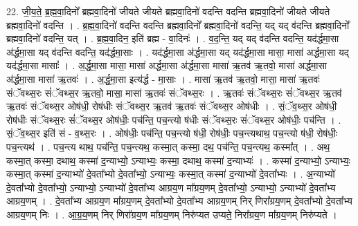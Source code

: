 \documentclass[17pt]{extarticle}
\begin{document}
22. जी॒य॒ते॒ ब्र॒ह्म॒वा॒दिनो᳚ ब्रह्मवा॒दिनो॑ जीयते जीयते ब्रह्मवा॒दिनो॑ वदन्ति वदन्ति ब्रह्मवा॒दिनो॑ जीयते जीयते ब्रह्मवा॒दिनो॑ वदन्ति । . ब्र॒ह्म॒वा॒दिनो॑ वदन्ति वदन्ति ब्रह्मवा॒दिनो᳚ ब्रह्मवा॒दिनो॑ वदन्ति॒ यद् यद् व॑दन्ति ब्रह्मवा॒दिनो᳚ ब्रह्मवा॒दिनो॑ वदन्ति॒ यत् । . ब्र॒ह्म॒वा॒दिन॒ इति॑ ब्रह्म - वा॒दिनः॑ । . व॒द॒न्ति॒ यद् यद् व॑दन्ति वदन्ति॒ यद॑र्द्धमा॒सा अ॑र्द्धमा॒सा यद् व॑दन्ति वदन्ति॒ यद॑र्द्धमा॒साः । . यद॑र्द्धमा॒सा अ॑र्द्धमा॒सा यद् यद॑र्द्धमा॒सा मासा॒ मासा॑ अर्द्धमा॒सा यद् यद॑र्द्धमा॒सा मासाः᳚ । . अ॒र्द्ध॒मा॒सा मासा॒ मासा॑ अर्द्धमा॒सा अ॑र्द्धमा॒सा मासा॑ ऋ॒तव॑ ऋ॒तवो॒ मासा॑ अर्द्धमा॒सा अ॑र्द्धमा॒सा मासा॑ ऋ॒तवः॑ । . अ॒र्द्ध॒मा॒सा इत्य॑र्द्ध - मा॒साः । . मासा॑ ऋ॒तव॑ ऋ॒तवो॒ मासा॒ मासा॑ ऋ॒तवः॑ संॅवथ्स॒रः सं॑ॅवथ्स॒र ऋ॒तवो॒ मासा॒ मासा॑ ऋ॒तवः॑ संॅवथ्स॒रः । . ऋ॒तवः॑ संॅवथ्स॒रः सं॑ॅवथ्स॒र ऋ॒तव॑ ऋ॒तवः॑ संॅवथ्स॒र ओष॑धी॒ रोष॑धीः संॅवथ्स॒र ऋ॒तव॑ ऋ॒तवः॑ संॅवथ्स॒र ओष॑धीः । . सं॒ॅव॒थ्स॒र ओष॑धी॒ रोष॑धीः संॅवथ्स॒रः सं॑ॅवथ्स॒र ओष॑धीः॒ पच॑न्ति॒ पच॒न्त्यो ष॑धीः संॅवथ्स॒रः सं॑ॅवथ्स॒र ओष॑धीः॒ पच॑न्ति । . सं॒ॅव॒थ्स॒र इति॑ सं - व॒थ्स॒रः । . ओष॑धीः॒ पच॑न्ति॒ पच॒न्त्यो ष॑धी॒ रोष॑धीः॒ पच॒न्त्यथाथ॒ पच॒न्त्यो ष॑धी॒ रोष॑धीः॒ पच॒न्त्यथ॑ । . पच॒न्त्य थाथ॒ पच॑न्ति॒ पच॒न्त्यथ॒ कस्मा॒त् कस्मा॒ दथ॒ पच॑न्ति॒ पच॒न्त्यथ॒ कस्मा᳚त् । . अथ॒ कस्मा॒त् कस्मा॒ दथाथ॒ कस्मा॑ द॒न्याभ्यो॒ ऽन्याभ्यः॒ कस्मा॒ दथाथ॒ कस्मा॑ द॒न्याभ्यः॑ । . कस्मा॑ द॒न्याभ्यो॒ ऽन्याभ्यः॒ कस्मा॒त् कस्मा॑ द॒न्याभ्यो॑ दे॒वता᳚भ्यो दे॒वता᳚भ्यो॒ ऽन्याभ्यः॒ कस्मा॒त् कस्मा॑ द॒न्याभ्यो॑ दे॒वता᳚भ्यः । . अ॒न्याभ्यो॑ दे॒वता᳚भ्यो दे॒वता᳚भ्यो॒ ऽन्याभ्यो॒ ऽन्याभ्यो॑ दे॒वता᳚भ्य आग्रय॒ण मा᳚ग्रय॒णम् दे॒वता᳚भ्यो॒ ऽन्याभ्यो॒ ऽन्याभ्यो॑ दे॒वता᳚भ्य आग्रय॒णम् । . दे॒वता᳚भ्य आग्रय॒ण मा᳚ग्रय॒णम् दे॒वता᳚भ्यो दे॒वता᳚भ्य आग्रय॒णम् निर् णिरा᳚ग्रय॒णम् दे॒वता᳚भ्यो दे॒वता᳚भ्य आग्रय॒णम् निः । . आ॒ग्र॒य॒णम् निर् णिरा᳚ग्रय॒ण मा᳚ग्रय॒णम् निरु॑प्यत उप्यते॒ निरा᳚ग्रय॒ण मा᳚ग्रय॒णम् निरु॑प्यते । \newline
\end{document}
